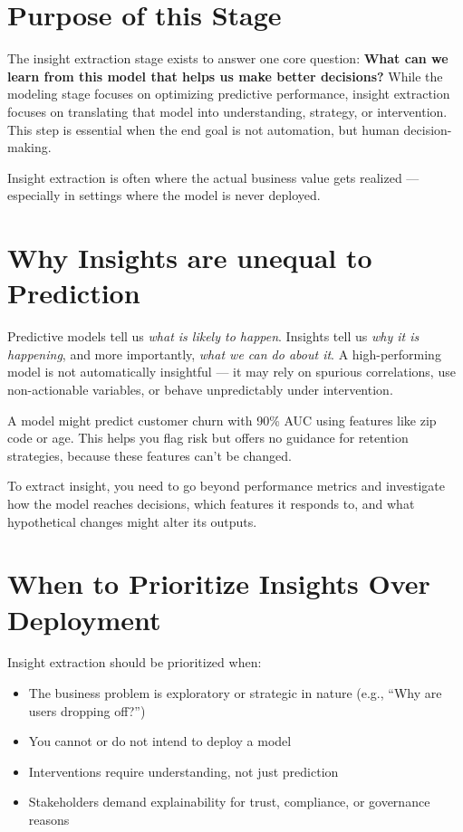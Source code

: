 \documentclass[12pt,openany, draft]{book}
\begin{document}
\section{Purpose of this Stage}

The insight extraction stage exists to answer one core question: \textbf{What can we learn from this model that helps us make better decisions?} While the modeling stage focuses on optimizing predictive performance, insight extraction focuses on translating that model into understanding, strategy, or intervention. This step is essential when the end goal is not automation, but human decision-making.

\begin{notebox}
Insight extraction is often where the actual business value gets realized — especially in settings where the model is never deployed.
\end{notebox}



\section{Why Insights are unequal to Prediction}

Predictive models tell us \emph{what is likely to happen}. Insights tell us \emph{why it is happening}, and more importantly, \emph{what we can do about it}. A high-performing model is not automatically insightful — it may rely on spurious correlations, use non-actionable variables, or behave unpredictably under intervention.

\begin{examplebox}
A model might predict customer churn with 90\% AUC using features like zip code or age. This helps you flag risk but offers no guidance for retention strategies, because these features can’t be changed.
\end{examplebox}

To extract insight, you need to go beyond performance metrics and investigate how the model reaches decisions, which features it responds to, and what hypothetical changes might alter its outputs.



\section{When to Prioritize Insights Over Deployment}

Insight extraction should be prioritized when:
\begin{itemize}
  \item The business problem is exploratory or strategic in nature (e.g., ``Why are users dropping off?'')
  \item You cannot or do not intend to deploy a model
  \item Interventions require understanding, not just prediction
  \item Stakeholders demand explainability for trust, compliance, or governance reasons
\end{itemize}
\end{document}
